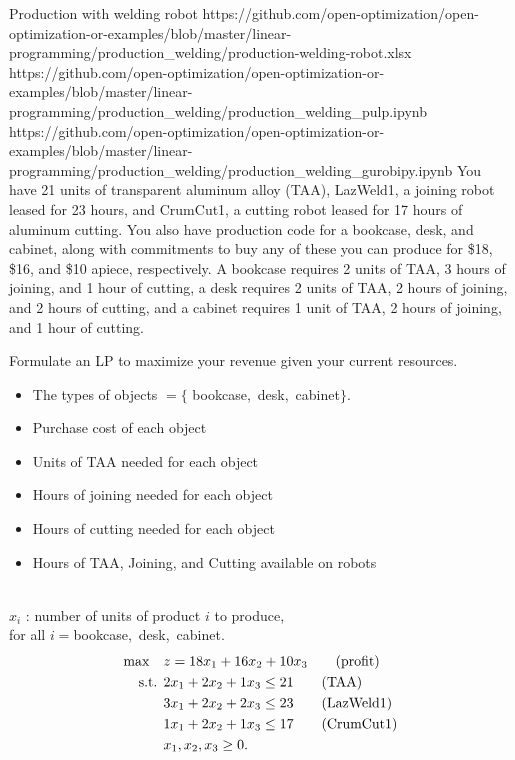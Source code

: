 \begin{examplewithallcode}{Production with welding robot}
{https://github.com/open-optimization/open-optimization-or-examples/blob/master/linear-programming/production_welding/production-welding-robot.xlsx}
{https://github.com/open-optimization/open-optimization-or-examples/blob/master/linear-programming/production_welding/production_welding_pulp.ipynb}
{https://github.com/open-optimization/open-optimization-or-examples/blob/master/linear-programming/production_welding/production_welding_gurobipy.ipynb}
\label{example:welding-robot}
You have 21 units of transparent aluminum alloy (TAA), LazWeld1, a joining robot leased for 23 hours, and CrumCut1, a cutting robot leased for 17 hours of aluminum cutting. You also have production code for a bookcase, desk, and cabinet, along with commitments to buy any of these you can produce for \$18,  \$16, and  \$10 apiece, respectively.  A bookcase requires 2 units of TAA, 3 hours of joining, and 1 hour of cutting, a desk requires 2 units of TAA, 2 hours of joining, and 2 hours of cutting, and a cabinet requires 1 unit of TAA, 2 hours of joining, and 1 hour of cutting. 

Formulate an LP to maximize your revenue given your current resources.
\end{examplewithallcode}

\begin{solution}

\noindent\medskip {}
\begin{itemize}
\item The types of objects $ = \{$ bookcase,~desk,~cabinet$\}$.
\end{itemize}
\medskip {} 
\begin{itemize}
\item Purchase cost of each object
\item Units of TAA needed for each object
\item Hours of joining needed for each object
\item Hours of cutting needed for each object
\item Hours of TAA, Joining, and Cutting available on robots
\end{itemize}

\noindent\medskip {} \\
$x_i$ : number of units of product $i$ to produce, \\
for all $ i = $bookcase,~desk,~cabinet.\\

\noindent \medskip {}
\begin{align*}
\max \quad & z = 18x_1 + 16x_2 + 10x_3   \tag{profit} \\
\text{ s.t. }        & 2x_1 + 2x_2 + 1x_3 \le 21   \tag{TAA} \\
& 3x_1 + 2x_2 + 2x_3 \le 23   \tag{LazWeld1} \\
& 1x_1 + 2x_2 + 1x_3 \le 17   \tag{CrumCut1} \\
& x_1, x_2, x_3 \ge 0.
\end{align*}
\end{solution}

